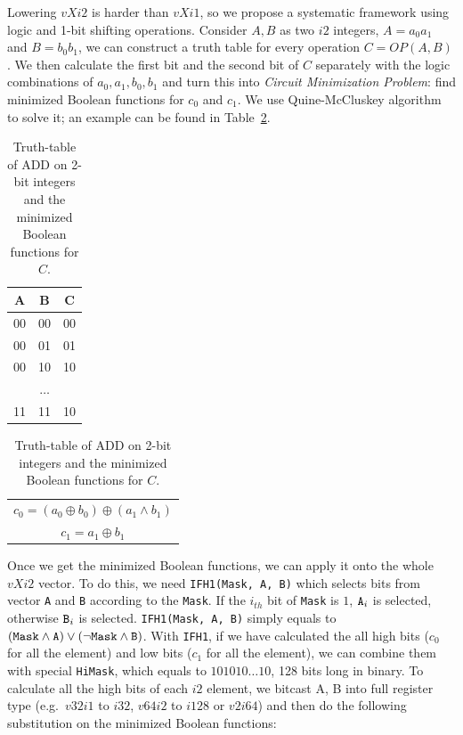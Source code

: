 Lowering $vXi2$ is harder than $vXi1$, so we propose a systematic framework using logic and 1-bit shifting operations. Consider $A, B$ as two $i2$ integers, $A=a_0a_1$ and $B=b_0b_1$, we can construct a truth table for every operation $C = OP(A, B)$. We then calculate the first bit and the second bit of $C$ separately with the logic combinations of $a_0, a_1, b_0, b_1$ and turn this into \textit{Circuit Minimization Problem}: find minimized Boolean functions for $c_0$ and $c_1$. We use Quine-McCluskey algorithm\cite{johnson1981quine} to solve it; an example can be found in Table~\ref{table:quine}.

\begin{table}[h]
  \centering
  \begin{tabular}{ccc}
    \hline
    A                   & B                   & C                  \\ \hline
    00                  & 00                  & 00                 \\
    00                  & 01                  & 01                 \\
    00                  & 10                  & 10                 \\
    \multicolumn{3}{c}{$\ldots$}                                        \\
    11                  & 11                  & 10                 \\ \hline
  \end{tabular}

  \begin{tabular}{lll}
    \\
    \multicolumn{3}{c}{$c_0 = (a_0 \oplus b_0) \oplus (a_1 \land b_1)$} \\
    \multicolumn{3}{c}{$c_1 = a_1 \oplus b_1$}
  \end{tabular}
  \caption{Truth-table of ADD on 2-bit integers and the minimized Boolean functions for $C$.}
  \label{table:quine}
\end{table}

Once we get the minimized Boolean functions, we can apply it onto the whole $vXi2$ vector. To do this, we need {\tt IFH1(Mask, A, B)} which selects bits from vector {\tt A} and {\tt B} according to the {\tt Mask}. If the $i_{th}$ bit of {\tt Mask} is $1$, $\text{\tt A}_i$ is selected, otherwise $\text{\tt B}_i$ is selected. {\tt IFH1(Mask, A, B)} simply equals to $(\text{\tt Mask} \land \text{\tt A}) \lor (\lnot \text{\tt Mask} \land \text{\tt B})$. With {\tt IFH1}, if we have calculated the all high bits ($c_0$ for all the element) and low bits ($c_1$ for all the element), we can combine them with special {\tt HiMask}, which equals to $101010 \ldots 10$, 128 bits long in binary. To calculate all the high bits of each $i2$ element, we bitcast A, B into full register type (e.g.\ $v32i1$ to $i32$, $v64i2$ to $i128$ or $v2i64$) and then do the following substitution on the minimized Boolean functions:


